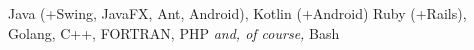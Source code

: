 
\begin{sectiondescription}
  Java (+Swing, JavaFX, Ant, Android),
  Kotlin (+Android)
  Ruby (+Rails), Golang,
  C++, FORTRAN, PHP \textit{and, of course,} Bash
\end{sectiondescription}
